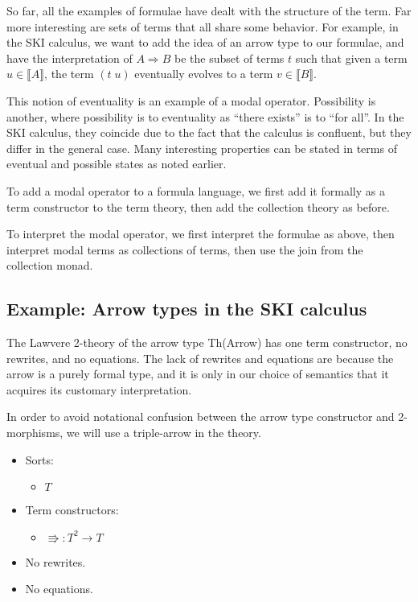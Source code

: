 \documentclass{llncs}
\newcommand{\interp}[1]{\llbracket #1 \rrbracket}
\newcommand{\maps}{\colon}
\begin{document}
So far, all the examples of formulae have dealt with the structure of the term.  Far more interesting are sets of terms that all share some behavior.  For example, in the SKI calculus, we want to add the idea of an arrow type to our formulae, and have the interpretation of $A \Rightarrow B$ be the subset of terms $t$ such that given a term $u\in\interp{A}$, the term $(t\; u)$ eventually evolves to a term $v\in\interp{B}.$

This notion of eventuality is an example of a modal operator.  Possibility is another, where possibility is to eventuality as ``there exists'' is to ``for all''.  In the SKI calculus, they coincide due to the fact that the calculus is confluent, but they differ in the general case. Many interesting properties can be stated in terms of eventual and possible states as noted earlier.

To add a modal operator to a formula language, we first add it formally as a term constructor to the term theory, then add the collection theory as before.  

To interpret the modal operator, we first interpret the formulae as above, then interpret modal terms as collections of terms, then use the join from the collection monad.

\subsection{Example: Arrow types in the SKI calculus}

The Lawvere 2-theory of the arrow type Th(Arrow) has one term constructor, no rewrites, and no equations.  The lack of rewrites and equations are because the arrow is a purely formal type, and it is only in our choice of semantics that it acquires its customary interpretation.

In order to avoid notational confusion between the arrow type constructor and 2-morphisms, we will use a triple-arrow in the theory.
\begin{itemize}
  \item Sorts:
  \begin{itemize}
    \item $T$
  \end{itemize}
  \item Term constructors:
    \begin{itemize}
      \item $\Rrightarrow \maps T^2 \to T$
    \end{itemize}
  \item No rewrites.
  \item No equations.
\end{itemize}
\end{document}
